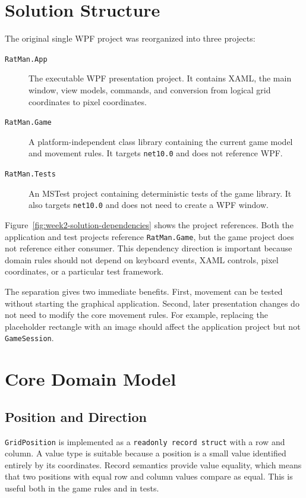 \section{Solution Structure}

The original single WPF project was reorganized into three projects:

\begin{description}
	\item[\texttt{RatMan.App}] The executable WPF presentation project. It contains XAML, the main window, view models, commands, and conversion from logical grid coordinates to pixel coordinates.

	\item[\texttt{RatMan.Game}] A platform-independent class library containing the current game model and movement rules. It targets \texttt{net10.0} and does not reference WPF.

	\item[\texttt{RatMan.Tests}] An MSTest project containing deterministic tests of the game library. It also targets \texttt{net10.0} and does not need to create a WPF window.
\end{description}



Figure~\ref{fig:week2-solution-dependencies} shows the project references. Both the application and test projects reference \texttt{RatMan.Game}, but the game project does not reference either consumer. This dependency direction is important because domain rules should not depend on keyboard events, XAML controls, pixel coordinates, or a particular test framework.

The separation gives two immediate benefits. First, movement can be tested without starting the graphical application. Second, later presentation changes do not need to modify the core movement rules. For example, replacing the placeholder rectangle with an image should affect the application project but not \texttt{GameSession}.

\section{Core Domain Model}

\subsection{Position and Direction}

\texttt{GridPosition} is implemented as a \texttt{readonly record struct} with a row and column. A value type is suitable because a position is a small value identified entirely by its coordinates. Record semantics provide value equality, which means that two positions with equal row and column values compare as equal. This is useful both in the game rules and in tests.

